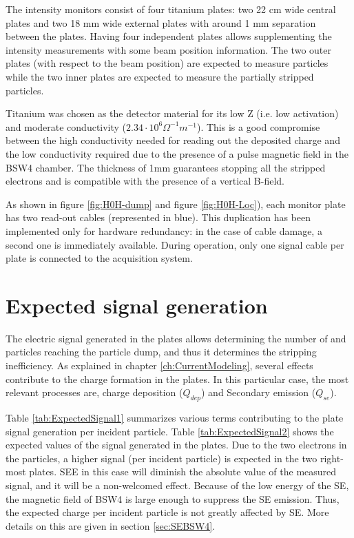 The \hzhm intensity monitors consist of four titanium plates: two 22 cm wide central plates and two 18 mm wide external plates with around 1 mm separation between the plates. Having four independent plates allows supplementing the intensity measurements with some beam position information. The two outer plates (with respect to the beam position) are expected to measure \hm particles while the two inner plates are expected to measure the partially stripped \hzz particles. 

Titanium was chosen as the detector material for its low Z (i.e. low activation) and moderate conductivity ($2.34\cdot 10^6 \Omega^{-1} m^{-1}$). This is a good compromise between the high conductivity needed for reading out the deposited charge and the low conductivity required due to the presence of a pulse magnetic field in the BSW4 chamber. The thickness of 1mm guarantees stopping all the stripped electrons and is compatible with the presence of a vertical B-field. 

As shown in figure \ref{fig:H0H-dump} and figure \ref{fig:H0H-Loc}), each monitor plate has two read-out cables (represented in blue). This duplication has been implemented only for hardware redundancy: in the case of cable damage, a second one is immediately available. During operation, only one signal cable per plate is connected to the acquisition system.

\section{Expected signal generation}

The electric signal generated in the plates allows determining the number of \hzz and \hm particles reaching the particle dump, and thus it determines the stripping inefficiency. As explained in chapter \ref{ch:CurrentModeling}, several effects contribute to the charge formation in the plates. In this particular case, the most relevant processes are, charge deposition ($Q_{dep}$) and Secondary emission ($Q_{se}$). 

Table \ref{tab:ExpectedSignal1} summarizes various terms contributing to the plate signal generation per incident particle. Table \ref{tab:ExpectedSignal2} shows the expected values of the signal generated in the \hzhm plates. Due to the two electrons in the \hm particles, a higher signal (per incident particle) is expected in the two right-most plates. SEE in this case will diminish the absolute value of the measured signal, and it will be a non-welcomed effect. Because of the low energy of the SE, the magnetic field of BSW4 is large enough to suppress the SE emission. Thus, the expected charge per incident particle is not greatly affected by SE. More details on this are given in section \ref{sec:SEBSW4}.

